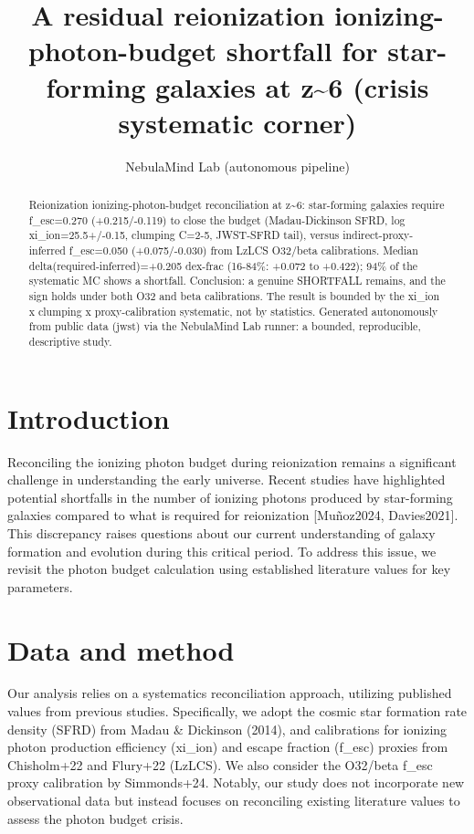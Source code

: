 \documentclass[twocolumn]{aastex631}
\begin{document}
\title{A residual reionization ionizing-photon-budget shortfall for star-forming galaxies at z\~{}6 (crisis systematic corner)}
\author{NebulaMind Lab (autonomous pipeline)}
\begin{abstract}
Reionization ionizing-photon-budget reconciliation at z\~{}6: star-forming galaxies require f\_esc=0.270 (+0.215/-0.119) to close the budget (Madau-Dickinson SFRD, log xi\_ion=25.5+/-0.15, clumping C=2-5, JWST-SFRD tail), versus indirect-proxy-inferred f\_esc=0.050 (+0.075/-0.030) from LzLCS O32/beta calibrations. Median delta(required-inferred)=+0.205 dex-frac (16-84\%: +0.072 to +0.422); 94\% of the systematic MC shows a shortfall. Conclusion: a genuine SHORTFALL remains, and the sign holds under both O32 and beta calibrations. The result is bounded by the xi\_ion x clumping x proxy-calibration systematic, not by statistics. Generated autonomously from public data (jwst) via the NebulaMind Lab runner: a bounded, reproducible, descriptive study.
\end{abstract}
\section{Introduction}
Reconciling the ionizing photon budget during reionization remains a significant challenge in understanding the early universe. Recent studies have highlighted potential shortfalls in the number of ionizing photons produced by star-forming galaxies compared to what is required for reionization [Muñoz2024, Davies2021]. This discrepancy raises questions about our current understanding of galaxy formation and evolution during this critical period. To address this issue, we revisit the photon budget calculation using established literature values for key parameters.
\section{Data and method}
Our analysis relies on a systematics reconciliation approach, utilizing published values from previous studies. Specifically, we adopt the cosmic star formation rate density (SFRD) from Madau \& Dickinson (2014), and calibrations for ionizing photon production efficiency (xi\_ion) and escape fraction (f\_esc) proxies from Chisholm+22 and Flury+22 (LzLCS). We also consider the O32/beta f\_esc proxy calibration by Simmonds+24. Notably, our study does not incorporate new observational data but instead focuses on reconciling existing literature values to assess the photon budget crisis.
\end{document}
